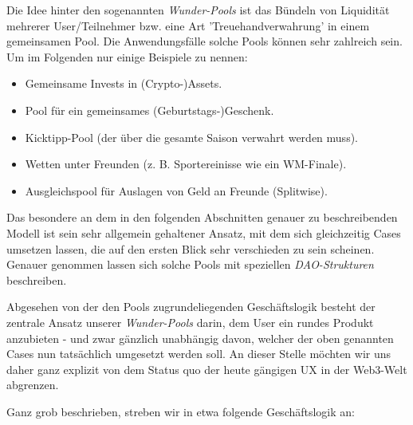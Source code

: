 
Die Idee hinter den sogenannten \textit{Wunder-Pools} ist das Bündeln von Liquidität mehrerer User/Teilnehmer bzw. eine Art 'Treuehandverwahrung' in einem gemeinsamen Pool. Die Anwendungsfälle solche Pools können sehr zahlreich sein. Um im Folgenden nur einige Beispiele zu nennen:  

\begin{itemize}
  \item Gemeinsame Invests in (Crypto-)Assets.
  \item Pool für ein gemeinsames (Geburtstags-)Geschenk.
  \item Kicktipp-Pool (der über die gesamte Saison verwahrt werden muss).
  \item Wetten unter Freunden (z. B. Sportereinisse wie ein WM-Finale).
  \item Ausgleichspool für Auslagen von Geld an Freunde (Splitwise).
\end{itemize}

\vspace{0.2cm}

Das besondere an dem in den folgenden Abschnitten genauer zu beschreibenden Mo\-dell ist sein sehr allgemein gehaltener Ansatz, mit dem sich gleichzeitig Cases umsetzen lassen, die auf den ersten Blick sehr verschieden zu sein scheinen. Genauer genommen lassen sich solche Pools mit speziellen \textit{DAO-Strukturen} beschreiben.

Abgesehen von der den Pools zugrundeliegenden Geschäftslogik besteht der zentrale Ansatz unserer \textit{Wunder-Pools} darin, dem User ein rundes Produkt anzubieten - und zwar gänzlich unabhängig davon, welcher der oben genannten Cases nun tatsächlich umgesetzt werden soll. An dieser Stelle möchten wir uns daher ganz explizit von dem Status quo der heute gängigen UX in der Web3-Welt abgrenzen.

\vspace{0.4cm}

Ganz grob beschrieben, streben wir in etwa folgende Geschäftslogik an:

